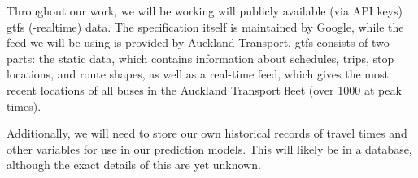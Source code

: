 \documentclass[12pt,a4paper]{article}
\begin{document}



















Throughout our work, we will be working will publicly available (via API keys) \gls{gtfs}
(-realtime) data.
The specification itself is maintained by Google, 
while the feed we will be using is provided by Auckland Transport.
\gls{gtfs} consists of two parts:
the static data, which contains information about schedules, trips, stop locations,
and route shapes, as well as a real-time feed, which gives the most recent locations
of all buses in the Auckland Transport fleet (over 1000 at peak times).


Additionally, we will need to store our own historical records of travel times and other
variables for use in our prediction models. 
This will likely be in a database, although the exact details of this are yet unknown.
\end{document}

